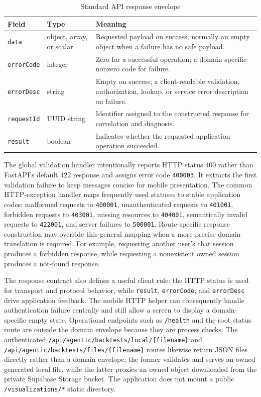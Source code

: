 \begin{table}[H]
    \centering
    \caption{Standard API response envelope}
    \label{tab:backend-response-envelope}
    \small
    \setlength{\tabcolsep}{6pt}
    \renewcommand{\arraystretch}{1.2}
    \begin{tabular}{p{2.6cm} p{2.3cm} p{7.0cm}}
        \toprule
        \textbf{Field} & \textbf{Type} & \textbf{Meaning} \\
        \midrule
        \texttt{data} & object, array, or scalar & Requested payload on success; normally an empty object when a failure has no safe payload. \\
        \texttt{errorCode} & integer & Zero for a successful operation; a domain-specific nonzero code for failure. \\
        \texttt{errorDesc} & string & Empty on success; a client-readable validation, authorization, lookup, or service error description on failure. \\
        \texttt{requestId} & UUID string & Identifier assigned to the constructed response for correlation and diagnosis. \\
        \texttt{result} & boolean & Indicates whether the requested application operation succeeded. \\
        \bottomrule
    \end{tabular}
\end{table}

The global validation handler intentionally reports HTTP status 400 rather than FastAPI's default 422 response and assigns error code \texttt{400003}. It extracts the first validation failure to keep messages concise for mobile presentation. The common HTTP-exception handler maps frequently used statuses to stable application codes: malformed requests to \texttt{400001}, unauthenticated requests to \texttt{401001}, forbidden requests to \texttt{403001}, missing resources to \texttt{404001}, semantically invalid requests to \texttt{422001}, and server failures to \texttt{500001}. Route-specific response construction may override this general mapping when a more precise domain translation is required. For example, requesting another user's chat session produces a forbidden response, while requesting a nonexistent owned session produces a not-found response.

The response contract also defines a useful client rule: the HTTP status is used for transport and protocol behavior, while \texttt{result}, \texttt{errorCode}, and \texttt{errorDesc} drive application feedback. The mobile HTTP helper can consequently handle authentication failure centrally and still allow a screen to display a domain-specific empty state. Operational endpoints such as \texttt{/health} and the root status route are outside the domain envelope because they are process checks. The authenticated \texttt{/api/agentic/backtests/local/\{filename\}} and \texttt{/api/agentic/backtests/files/\{filename\}} routes likewise return JSON files directly rather than a domain envelope; the former validates and serves an owned generated local file, while the latter proxies an owned object downloaded from the private Supabase Storage bucket. The application does not mount a public \texttt{/visualizations/*} static directory.

